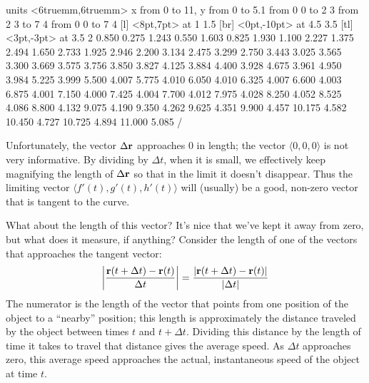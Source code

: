 \figure
\vbox{\beginpicture
\normalgraphs
\ninepoint
\setcoordinatesystem units <6truemm,6truemm>
\setplotarea x from 0 to 11, y from 0 to 5.1
\arrow <5pt> [0.17, 0.5] from 0 0 to 2 3
\altarrow <5pt,5pt> [0.17, 0.5] from 2 3 to 7 4
\altarrow <5pt,5pt> [0.17, 0.5] from 0 0 to 7 4
 [l] <8pt,7pt> at 1 1.5
 [br] <0pt,-10pt> at 4.5 3.5
 [tl]
  <3pt,-3pt> at 3.5 2
\setquadratic
 0.850 0.275 1.243 0.550 1.603 0.825 1.930 1.100 2.227 
1.375 2.494 1.650 2.733 1.925 2.946 2.200 3.134 2.475 3.299 
2.750 3.443 3.025 3.565 3.300 3.669 3.575 3.756 3.850 3.827 
4.125 3.884 4.400 3.928 4.675 3.961 4.950 3.984 5.225 3.999 
5.500 4.007 5.775 4.010 6.050 4.010 6.325 4.007 6.600 4.003 
6.875 4.001 7.150 4.000 7.425 4.004 7.700 4.012 7.975 4.028 
8.250 4.052 8.525 4.086 8.800 4.132 9.075 4.190 9.350 4.262 
9.625 4.351 9.900 4.457 10.175 4.582 10.450 4.727 10.725 4.894 
11.000 5.085 /
\endpicture}

Unfortunately, the vector $\Delta{\bf r}$ approaches 0 in length; the
vector $\langle 0,0,0\rangle$ is not very informative. By dividing by
$\Delta t$, when it is small, we effectively keep magnifying the
length of $\Delta{\bf r}$ so that in the limit it doesn't disappear. Thus the
limiting vector $\langle f'(t),g'(t),h'(t)\rangle$ will (usually) be a
good, non-zero vector that is tangent to the curve.

What about the length of this vector? It's nice that we've kept it
away from zero, but what does it measure, if anything?
Consider the length of one of the vectors that approaches the tangent
vector:
$$\left|{{\bf r}(t+\Delta t)-{\bf r}(t)\over
\Delta t}\right|={|{\bf r}(t+\Delta t)-{\bf r}(t)|\over|\Delta t|}$$
The numerator is the length of the vector that points from one position
of the object to a ``nearby'' position; this length is approximately
the distance traveled by the object between times $t$ and $t+\Delta
t$. Dividing this distance by the length of time it takes to travel
that distance gives the average speed. As $\Delta t$ approaches zero,
this average speed approaches the actual, instantaneous speed of the
object at time $t$. 

